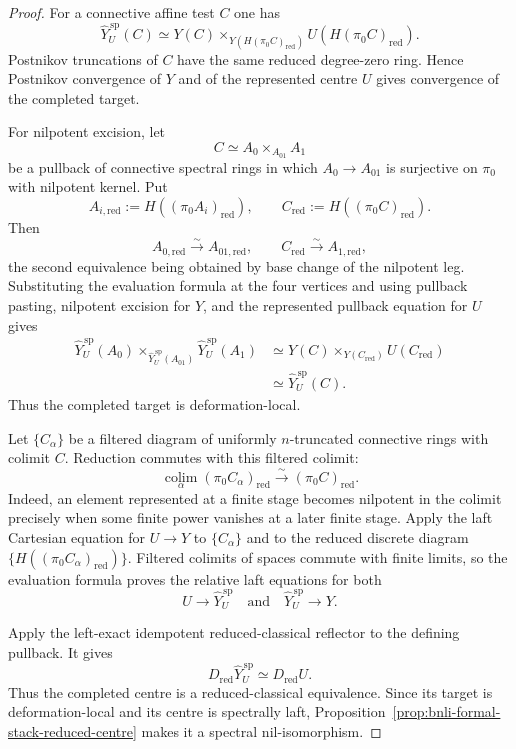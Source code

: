 \begin{proof}
For a connective affine test $C$ one has
\[
\boxed{
    \widehat Y^{\,\mathrm{sp}}_U(C)
    \simeq
    Y(C)\times_{Y(H(\pi_0C)_{\mathrm{red}})}
    U(H(\pi_0C)_{\mathrm{red}}).}
\]
Postnikov truncations of $C$ have the same reduced degree-zero ring.  Hence
Postnikov convergence of $Y$ and of the represented centre $U$ gives
convergence of the completed target.

For nilpotent excision, let
\[
    C\simeq A_0\times_{A_{01}}A_1
\]
be a pullback of connective spectral rings in which
$A_0\to A_{01}$ is surjective on $\pi_0$ with nilpotent kernel.  Put
\[
    A_{i,\mathrm{red}}
    :=H((\pi_0A_i)_{\mathrm{red}}),
    \qquad
    C_{\mathrm{red}}
    :=H((\pi_0C)_{\mathrm{red}}).
\]
Then
\[
    A_{0,\mathrm{red}}\xrightarrow{\sim}A_{01,\mathrm{red}},
    \qquad
    C_{\mathrm{red}}\xrightarrow{\sim}A_{1,\mathrm{red}},
\]
the second equivalence being obtained by base change of the nilpotent leg.
Substituting the evaluation formula at the four vertices and using pullback
pasting, nilpotent excision for $Y$, and the represented pullback equation for
$U$ gives
\[
\begin{aligned}
    \widehat Y_U^{\,\mathrm{sp}}(A_0)
    \times_{\widehat Y_U^{\,\mathrm{sp}}(A_{01})}
    \widehat Y_U^{\,\mathrm{sp}}(A_1)
    &\simeq
    Y(C)\times_{Y(C_{\mathrm{red}})}U(C_{\mathrm{red}})\\
    &\simeq
    \widehat Y_U^{\,\mathrm{sp}}(C).
\end{aligned}
\]
Thus the completed target is deformation-local.

Let $\{C_\alpha\}$ be a filtered diagram of uniformly $n$-truncated
connective rings with colimit $C$.  Reduction commutes with this filtered
colimit:
\[
\boxed{
    \operatorname*{colim}_\alpha
    (\pi_0C_\alpha)_{\mathrm{red}}
    \xrightarrow{\sim}
    (\pi_0C)_{\mathrm{red}}.}
\]
Indeed, an element represented at a finite stage becomes nilpotent in the
colimit precisely when some finite power vanishes at a later finite stage.
Apply the laft Cartesian equation for $U\to Y$ to $\{C_\alpha\}$ and to the
reduced discrete diagram
$\{H((\pi_0C_\alpha)_{\mathrm{red}})\}$.  Filtered colimits of spaces commute
with finite limits, so the evaluation formula proves the relative laft
equations for both
\[
    U\to\widehat Y_U^{\,\mathrm{sp}}
    \quad\text{and}\quad
    \widehat Y_U^{\,\mathrm{sp}}\to Y.
\]

Apply the left-exact idempotent reduced-classical reflector to the defining
pullback.  It gives
\[
    D_{\mathrm{red}}\widehat Y_U^{\,\mathrm{sp}}
    \simeq
    D_{\mathrm{red}}U.
\]
Thus the completed centre is a reduced-classical equivalence.  Since its
target is deformation-local and its centre is spectrally laft,
Proposition~\ref{prop:bnli-formal-stack-reduced-centre} makes it a spectral
nil-isomorphism.


\end{proof}
